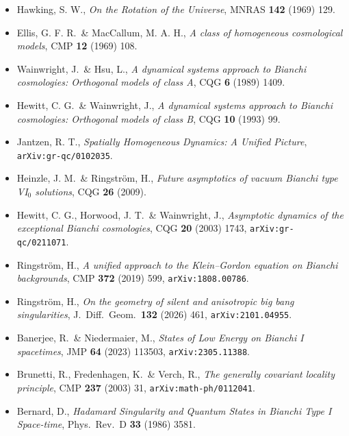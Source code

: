 \documentclass[11pt,a4paper]{article}
\begin{document}
\begin{itemize}
\item Hawking, S. W., \textit{On the Rotation of the Universe}, MNRAS
\textbf{142} (1969) 129.
\item Ellis, G. F. R.\ \& MacCallum, M. A. H., \textit{A class of
homogeneous cosmological models}, CMP \textbf{12} (1969) 108.
\item Wainwright, J.\ \& Hsu, L., \textit{A dynamical systems approach to
Bianchi cosmologies: Orthogonal models of class A}, CQG \textbf{6}
(1989) 1409.
\item Hewitt, C. G.\ \& Wainwright, J., \textit{A dynamical systems
approach to Bianchi cosmologies: Orthogonal models of class B}, CQG
\textbf{10} (1993) 99.
\item Jantzen, R. T., \textit{Spatially Homogeneous Dynamics: A Unified
Picture}, \texttt{arXiv:gr-qc/0102035}.
\item Heinzle, J. M.\ \& Ringström, H., \textit{Future asymptotics of
vacuum Bianchi type VI$_0$ solutions}, CQG \textbf{26} (2009).
\item Hewitt, C. G., Horwood, J. T.\ \& Wainwright, J., \textit{Asymptotic
dynamics of the exceptional Bianchi cosmologies}, CQG \textbf{20}
(2003) 1743, \texttt{arXiv:gr-qc/0211071}.
\item Ringström, H., \textit{A unified approach to the Klein--Gordon
equation on Bianchi backgrounds}, CMP \textbf{372} (2019) 599,
\texttt{arXiv:1808.00786}.
\item Ringström, H., \textit{On the geometry of silent and anisotropic big
bang singularities}, J.\ Diff.\ Geom.\ \textbf{132} (2026) 461,
\texttt{arXiv:2101.04955}.
\item Banerjee, R.\ \& Niedermaier, M., \textit{States of Low Energy on
Bianchi I spacetimes}, JMP \textbf{64} (2023) 113503,
\texttt{arXiv:2305.11388}.
\item Brunetti, R., Fredenhagen, K.\ \& Verch, R., \textit{The generally
covariant locality principle}, CMP \textbf{237} (2003) 31,
\texttt{arXiv:math-ph/0112041}.
\item Bernard, D., \textit{Hadamard Singularity and Quantum States in
Bianchi Type I Space-time}, Phys.\ Rev.\ D \textbf{33} (1986) 3581.
\end{itemize}
\end{document}
